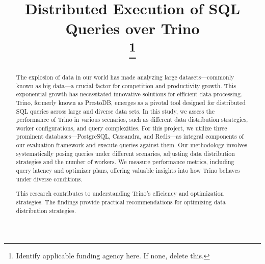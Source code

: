 \documentclass[conference]{IEEEtran}
\begin{document}
\title{Distributed Execution of SQL Queries over Trino \\
\thanks{Identify applicable funding agency here. If none, delete this.}
}

\author{
\and
{}
}

\maketitle

\begin{abstract}

The explosion of data in our world has made analyzing large datasets—commonly known as big data—a 
crucial factor for competition and productivity growth. This exponential growth has necessitated 
innovative solutions for efficient data processing. Trino, formerly known as PrestoDB, emerges as
a pivotal tool designed for distributed SQL queries across large and diverse data sets. In this 
study, we assess the performance of Trino in various scenarios, such as different data distribution 
strategies,  worker configurations, and query complexities. For this project, we utilize three 
prominent databases—PostgreSQL, Cassandra, and Redis—as integral components of our evaluation 
framework and execute queries against them. Our methodology involves systematically posing queries 
under different scenarios, adjusting data distribution strategies and the number of workers. We 
measure performance metrics, including query latency and optimizer plans, offering valuable insights 
into how Trino behaves under diverse conditions.

This research contributes to understanding Trino's efficiency and optimization strategies. 
The findings provide practical recommendations for optimizing data distribution strategies.

\end{abstract}
\end{document}

